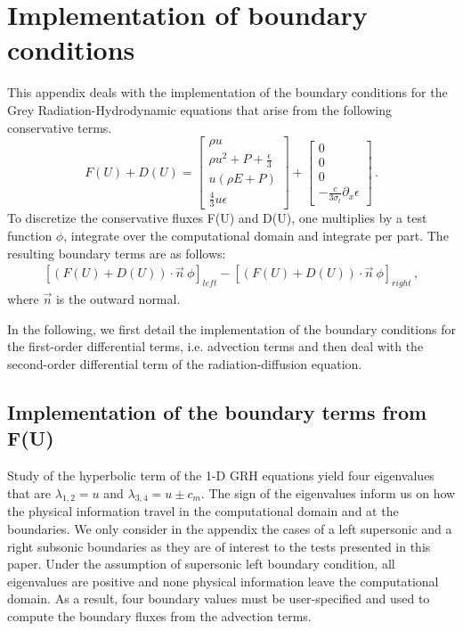 \section{Implementation of boundary conditions} \label{App:AppendixA}
This appendix deals with the implementation of the boundary conditions for the Grey Radiation-Hydrodynamic equations that arise from the following conservative terms.
%
\begin{equation}
F(U) + D(U) = 
\begin{bmatrix}
\rho u \\
\rho u^2 + P + \frac{\epsilon}{3} \\
u \left( \rho E + P \right) \\
\frac{4}{3} u \epsilon
\end{bmatrix}
+  
\begin{bmatrix}
0 \\
0 \\
0 \\
- \frac{c}{3 \sigma_t} \partial_x \epsilon
\end{bmatrix}
\,.
\end{equation}
%
To discretize the conservative fluxes F(U) and D(U), one multiplies by a test function $\phi$, integrate over the computational domain and integrate per part. The resulting boundary terms are as follows:
%
\begin{eqnarray}
\left[\left(F(U)+D(U)\right) \cdot \vec{n} \ \phi \right]_{left} - \left[ \left(F(U)+D(U)\right) \cdot \vec{n} \ \phi \right]_{right} \, ,
\end{eqnarray}
%
where $\vec{n}$ is the outward normal.

In the following, we first detail the implementation of the boundary conditions for the first-order differential terms, i.e. advection terms and then deal with the second-order differential term of the radiation-diffusion equation. 
%
%
\subsection{Implementation of the boundary terms from F(U)}
%
Study of the hyperbolic term of the 1-D GRH equations yield four eigenvalues that are $\lambda_{1,2}=u$ and $\lambda_{3,4}=u \pm c_m$. The sign of the eigenvalues inform us on how the physical information travel in the computational domain and at the boundaries. We only consider in the appendix the cases of a left supersonic and a right subsonic boundaries as they are of interest to the tests presented in this paper. Under the assumption of supersonic left boundary condition, all eigenvalues are positive and none physical information leave the computational domain. As a result, four boundary values must be user-specified and used to compute the boundary fluxes from the advection terms. 

